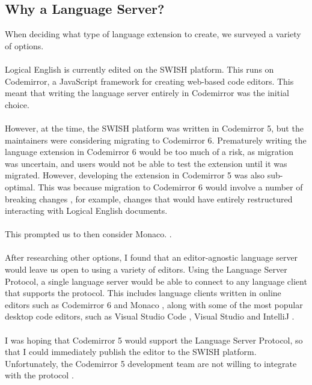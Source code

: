 \documentclass[../main.tex]{subfiles}
\begin{document}
\subsection{Why a Language Server?}
When deciding what type of language extension to create, we surveyed a variety of options. 
\\
\\
Logical English is currently edited on the SWISH platform. This runs on Codemirror, a JavaScript framework for creating web-based code editors. This meant that writing the language server entirely in Codemirror was the initial choice.
\\
\\
However, at the time, the SWISH platform was written in Codemirror 5, but the maintainers were considering migrating to Codemirror 6. Prematurely writing the language extension in Codemirror 6 would be too much of a risk, as migration was uncertain, and users would not be able to test the extension until it was migrated. However, developing the extension in Codemirror 5 was also sub-optimal. This was because migration to Codemirror 6 would involve a number of breaking changes \cite{codemirror_migration}, for example, changes that would have entirely restructured interacting with Logical English documents.
\\ 
\\ 
This prompted us to then consider Monaco. .
\\ 
\\ 
After researching other options, I found that an editor-agnostic language server would leave us open to using a variety of editors. Using the Language Server Protocol, a single language server would be able to connect to any language client that supports the protocol. This includes language clients written in online editors such as Codemirror 6 \cite{codemirror_6_language_server} and Monaco \cite{monaco_language_server}, along with some of the most popular desktop code editors, such as Visual Studio Code \cite{vsc_langserver_docs}, Visual Studio \cite{visual_studio_language_server} and IntelliJ \cite{intellij_language_server} \cite{ide_rankings}. 
\\
\\
I was hoping that Codemirror 5 would support the Language Server Protocol, so that I could immediately publish the editor to the SWISH platform. Unfortunately, the Codemirror 5 development team are not willing to integrate with the protocol \cite{codemirror5_no_lsp}. 
\end{document}

